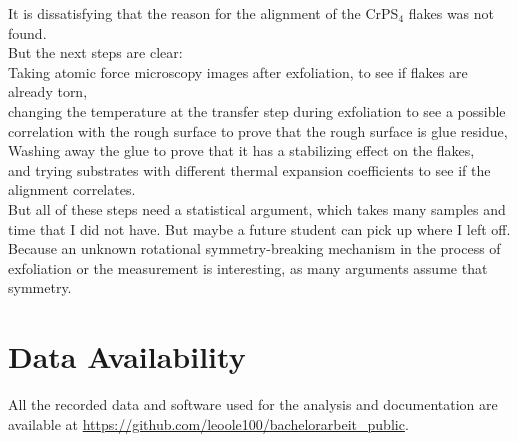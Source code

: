 \documentclass[
	oneside,
	parskip=half,
	a4paper,
]{scrbook}
\begin{document}
It is dissatisfying that the reason for the alignment of the CrPS$_4$ flakes was not found.\\
But the next steps are clear:\\
Taking atomic force microscopy images after exfoliation, to see if flakes are already torn,\\
changing the temperature at the transfer step during exfoliation to see a possible correlation with the rough surface to prove that the rough surface is glue residue,\\
Washing away the glue to prove that it has a stabilizing effect on the flakes,\\
and trying substrates with different thermal expansion coefficients to see if the alignment correlates. \\
But all of these steps need a statistical argument, which takes many samples and time that I did not have.
But maybe a future student can pick up where I left off.
Because an unknown rotational symmetry-breaking mechanism in the process of exfoliation or the measurement is interesting, as many arguments assume that symmetry.



\backmatter
{}
\nocite{*}
\printbibliography

\section*{Data Availability}
All the recorded data and software used for the analysis and documentation are available at \url{https://github.com/leoole100/bachelorarbeit_public}.

\end{document}
